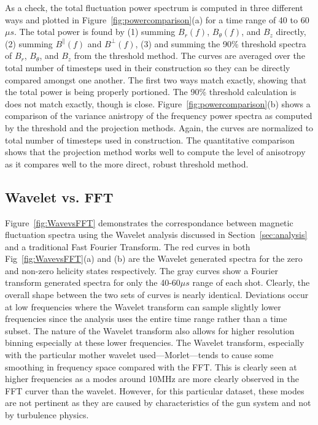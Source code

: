 \documentclass[aip,prl,amsmath,amssymb,reprint,superscriptaddress]{revtex4-1} %
\begin{document}
As a check, the total fluctuation power spectrum is computed in three different ways and plotted in Figure~\ref{fig:powercomparison}(a) for a time range of 40 to 60$\mu s$. The total power is found by (1) summing $B_{r}(f)$, $B_{\theta}(f)$, and $B_{z}$ directly, (2) summing $B^{\parallel}(f)$ and $B^{\perp}(f)$, (3) and summing the 90\% threshold spectra of $B_{r}$, $B_{\theta}$, and $B_{z}$ from the threshold method. The curves are averaged over the total number of timesteps used in their construction so they can be directly compared amongst one another. The first two ways match exactly, showing that the total power is being properly portioned. The 90\% threshold calculation is does not match exactly, though is close. Figure~\ref{fig:powercomparison}(b) shows a comparison of the variance anistropy of the frequency power spectra as computed by the threshold and the projection methods. Again, the curves are normalized to total number of timesteps used in construction. The quantitative comparison shows that the projection method works well to compute the level of anisotropy as it compares well to the more direct, robust threshold method.

\subsection{Wavelet vs. FFT}

Figure~\ref{fig:WavevsFFT} demonstrates the correspondance between magnetic fluctuation spectra using the Wavelet analysis discussed in Section~\ref{sec:analysis} and a traditional Fast Fourier Transform. The red curves in both Fig~\ref{fig:WavevsFFT}(a) and (b) are the Wavelet generated spectra for the zero and non-zero helicity states respectively. The gray curves show a Fourier transform generated spectra for only the 40-60$\mu s$ range of each shot. Clearly, the overall shape between the two sets of curves is nearly identical. Deviations occur at low frequencies where the Wavelet transform can sample slightly lower frequencies since the analysis uses the entire time range rather than a time subset. The nature of the Wavelet transform also allows for higher resolution binning especially at these lower frequencies. The Wavelet transform, especially with the particular mother wavelet used---Morlet---tends to cause some smoothing in frequency space compared with the FFT. This is clearly seen at higher frequencies as a modes around 10MHz are more clearly observed in the FFT curver than the wavelet. However, for this particular dataset, these modes are not pertinent as they are caused by characteristics of the gun system and not by turbulence physics.
\end{document}
